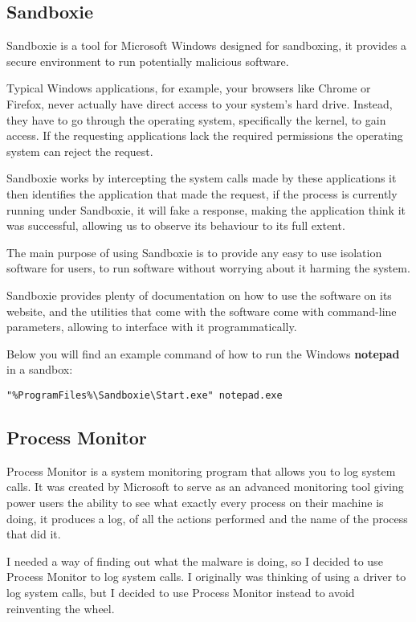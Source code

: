 \subsection{Sandboxie}
Sandboxie is a tool for Microsoft Windows designed for sandboxing,
it provides a secure environment to run potentially malicious software.

Typical Windows applications, for example, your browsers like Chrome or Firefox,
never actually have direct access to your system's hard drive.
Instead, they have to go through the operating system, specifically the kernel,
to gain access. If the requesting applications lack the required permissions
the operating system can reject the request.

Sandboxie works by intercepting the system calls made by these applications
it then identifies the application that made the request,
if the process is currently running under Sandboxie,
it will fake a response, making the application think it was successful,
allowing us to observe its behaviour to its full extent.

The main purpose of using Sandboxie is to provide any
easy to use isolation software for users, to run software
without worrying about it harming the system.

Sandboxie provides plenty of documentation on how to use the software on its website,
and the utilities that come with the software come with command-line parameters,
allowing to interface with it programmatically.

Below you will find an example command of how to run the Windows
\textbf{notepad} in a sandbox:

\begin{lstlisting}
"%ProgramFiles%\Sandboxie\Start.exe" notepad.exe
\end{lstlisting}

\subsection{Process Monitor}
Process Monitor is a system monitoring program that allows you to log system calls.
It was created by Microsoft to serve as an advanced monitoring tool giving power users
the ability to see what exactly every process on their machine is doing,
it produces a log, of all the actions performed and the name of the process that did it.

I needed a way of finding out what the malware is doing,
so I decided to use Process Monitor to log system calls.
I originally was thinking of using a driver to log system calls,
but I decided to use Process Monitor instead to avoid reinventing the wheel.

